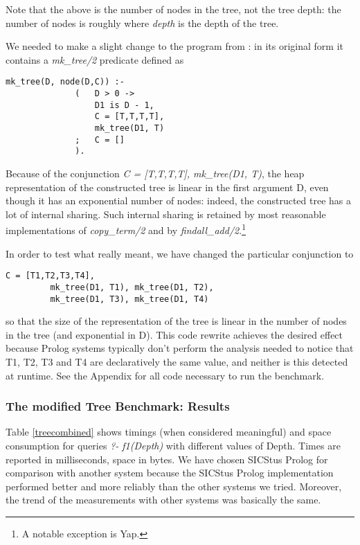 \documentclass{tlp}
\begin{document}
Note that the  above is the number of nodes in the tree, not the
tree depth: the number of nodes is roughly  where {\em
depth} is the depth of the tree.

We needed to make a slight change to the program from
\cite{OKeefePearl}: in its original form it contains a {\em mk\_tree/2}
predicate defined as

\begin{Verbatim}[fontsize=\small, frame=single,samepage=true]
       mk_tree(D, node(D,C)) :-
              (   D > 0 ->
                  D1 is D - 1,
                  C = [T,T,T,T],
                  mk_tree(D1, T)
              ;   C = []
              ).
\end{Verbatim}
Because of the conjunction {\em C = [T,T,T,T], mk\_tree(D1, T)}, the
heap representation of the constructed tree is linear in the first
argument D, even though it has an exponential number of nodes: indeed,
the constructed tree has a lot of internal sharing. Such internal
sharing is retained by most reasonable implementations of {\em copy\_term/2}
and by {\em findall\_add/2}.\footnote{A notable exception is Yap.}

In order to test what \cite{OKeefePearl} really meant, we have changed
the particular conjunction to
\begin{Verbatim}[fontsize=\small, frame=single,samepage=true]
         C = [T1,T2,T3,T4],
         mk_tree(D1, T1), mk_tree(D1, T2),
         mk_tree(D1, T3), mk_tree(D1, T4)
\end{Verbatim}
so that the size of the representation of the tree is linear in the
number of nodes in the tree (and exponential in D). This code rewrite
achieves the desired effect because Prolog systems typically don't
perform the analysis needed to notice that T1, T2, T3 and T4 are
declaratively the same value, and neither is this detected at
runtime. See the Appendix for all code necessary to run the benchmark.

\subsubsection{The modified Tree Benchmark: Results}

Table \ref{treecombined} shows timings (when considered meaningful)
and space consumption for queries {\em ?- f1(Depth)} with different
values of Depth. Times are reported in milliseconds, space in
bytes. We have chosen SICStus Prolog for comparison with another
system because the SICStus Prolog implementation performed better and
more reliably than the other systems we tried. Moreover, the trend of
the measurements with other systems was basically the same.
\end{document}
